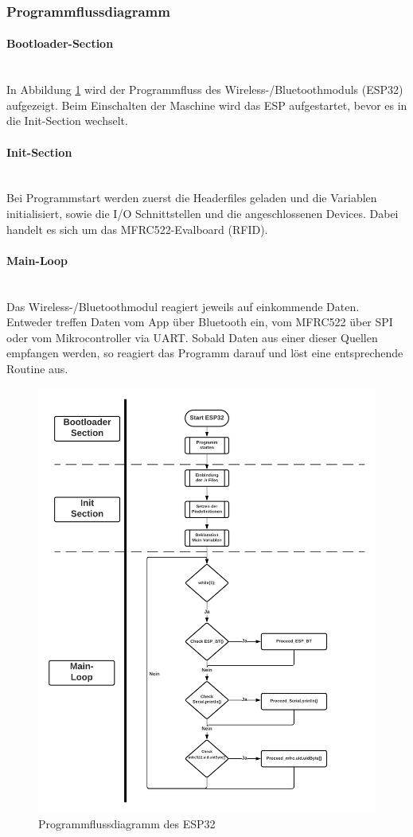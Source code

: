 \subsubsection{Programmflussdiagramm}
\label{subsubsec:Software_ESP32_Programmflussdiagramm}

\paragraph{Bootloader-Section}\mbox{}\\
In Abbildung \ref{fig:ProgrammflussESP} wird der Programmfluss des Wireless-/Bluetoothmoduls (ESP32) aufgezeigt. Beim Einschalten der Maschine wird das ESP aufgestartet, bevor es in die Init-Section wechselt.

\paragraph{Init-Section}\mbox{}\\
Bei Programmstart werden zuerst die Headerfiles geladen und die Variablen initialisiert, sowie die I/O Schnittstellen und die angeschlossenen Devices. Dabei handelt es sich um das MFRC522-Evalboard (RFID). 

\paragraph{Main-Loop}\mbox{}\\
Das Wireless-/Bluetoothmodul reagiert jeweils auf einkommende Daten. Entweder treffen Daten vom App über Bluetooth ein, vom MFRC522 über SPI oder vom Mikrocontroller via UART. Sobald Daten aus einer dieser Quellen empfangen werden, so reagiert das Programm darauf und löst eine entsprechende Routine aus. 


\begin{figure}[H]
	\centering
	\includegraphics[width=\textwidth]{graphics/ProgrammflussESP}
	\caption{Programmflussdiagramm des ESP32}
	\label{fig:ProgrammflussESP}
\end{figure}
\newpage